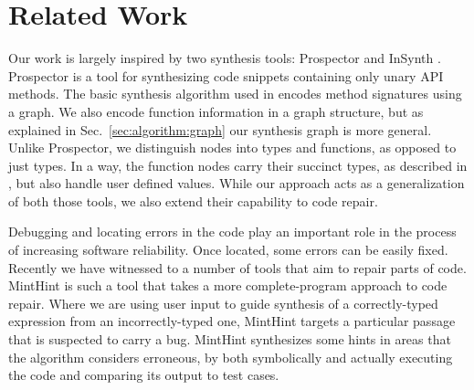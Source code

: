 \section{Related Work}
\label{sec:related}

Our work is largely inspired by two synthesis tools: Prospector \cite{MandelinetALL2005Jungloid} and InSynth \cite{GveroETAL13CompleteCompletionTypesWeights, DBLP:conf/cav/GveroKP11}. Prospector is a tool for synthesizing code snippets containing only unary API methods. The basic synthesis algorithm used in \cite{MandelinetALL2005Jungloid} encodes method signatures using a graph. We also encode function information in a graph structure, but as explained in Sec.~\ref{sec:algorithm:graph} our synthesis graph is more general. Unlike Prospector, we distinguish nodes into types and functions, as opposed to just types. In a way, the function nodes carry their succinct types, as described in \cite{GveroETAL13CompleteCompletionTypesWeights}, but also handle user defined values. While our approach acts as a generalization of both those tools, we also extend their capability to code repair.

Debugging and locating errors in the code \cite{Pavlinovic:2014, Chandra:2011:AD} play an important role in the process of increasing software reliability. Once located, some errors can be easily fixed. Recently we have witnessed to a number of tools that aim to repair parts of code. MintHint \cite{MintHint} is such a tool that takes a more complete-program approach to code repair. Where we are using user input to guide synthesis of a correctly-typed expression from an incorrectly-typed one, MintHint targets a particular passage that is suspected to carry a bug. MintHint synthesizes some hints in areas that the algorithm considers erroneous, by both symbolically and actually executing the code and comparing its output to test cases.
